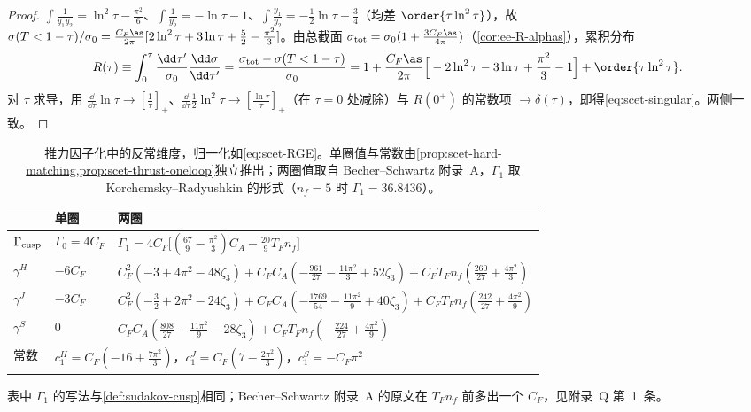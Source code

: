 \begin{proof}
$\int\frac{1}{y_1y_2}=\ln^2\tau-\frac{\pi^2}6$、$\int\frac1{y_2}=-\ln\tau-1$、$\int\frac{y_1}{y_2}=-\frac12\ln\tau-\frac34$（均差 $\order{\tau\ln^2\tau}$），故 $\sigma(T<1-\tau)/\sigma_0=\frac{C_F\as}{2\pi}[2\ln^2\tau+3\ln\tau+\frac52-\frac{\pi^2}{3}]$。由总截面 $\sigma_{\rm tot}=\sigma_0(1+\frac{3C_F\as}{4\pi})$（\cref{cor:ee-R-alphas}），累积分布
\[
R(\tau)\equiv\int_0^\tau\frac{\dd\tau'}{\sigma_0}\frac{\dd\sigma}{\dd\tau'}=\frac{\sigma_{\rm tot}-\sigma(T<1-\tau)}{\sigma_0}=1+\frac{C_F\as}{2\pi}\Big[-2\ln^2\tau-3\ln\tau+\frac{\pi^2}{3}-1\Big]+\order{\tau\ln^2\tau}.
\]
对 $\tau$ 求导，用 $\frac{\dd}{\dd\tau}\ln\tau\to[\frac1\tau]_+$、$\frac{\dd}{\dd\tau}\frac12\ln^2\tau\to[\frac{\ln\tau}\tau]_+$（在 $\tau=0$ 处减除）与 $R(0^+)$ 的常数项 $\to\delta(\tau)$，即得\cref{eq:scet-singular}。两侧一致。
\end{proof}

\begin{table}[htbp]
\centering\small
\renewcommand{\arraystretch}{1.3}
\begin{tabular}{@{}lll@{}}
\toprule
 & 单圈 & 两圈 \\
\midrule
$\Gamma_{\rm cusp}$ & $\Gamma_0=4C_F$ & $\Gamma_1=4C_F\big[(\frac{67}{9}-\frac{\pi^2}{3})C_A-\frac{20}{9}T_Fn_f\big]$ \\
$\gamma^H$ & $-6C_F$ & $C_F^2(-3+4\pi^2-48\zeta_3)+C_FC_A(-\frac{961}{27}-\frac{11\pi^2}{3}+52\zeta_3)+C_FT_Fn_f(\frac{260}{27}+\frac{4\pi^2}{3})$ \\
$\gamma^J$ & $-3C_F$ & $C_F^2(-\frac32+2\pi^2-24\zeta_3)+C_FC_A(-\frac{1769}{54}-\frac{11\pi^2}{9}+40\zeta_3)+C_FT_Fn_f(\frac{242}{27}+\frac{4\pi^2}{9})$ \\
$\gamma^S$ & $0$ & $C_FC_A(\frac{808}{27}-\frac{11\pi^2}{9}-28\zeta_3)+C_FT_Fn_f(-\frac{224}{27}+\frac{4\pi^2}{9})$ \\
常数 & \multicolumn{2}{l}{$c_1^H=C_F(-16+\frac{7\pi^2}{3})$，\quad $c_1^J=C_F(7-\frac{2\pi^2}{3})$，\quad $c_1^S=-C_F\pi^2$} \\
\bottomrule
\end{tabular}
\caption{推力因子化中的反常维度，归一化如\cref{eq:scet-RGE}。单圈值与常数由\cref{prop:scet-hard-matching,prop:scet-thrust-oneloop}独立推出；两圈值取自 Becher--Schwartz 附录~A\cite{BecherSchwartz2008}，$\Gamma_1$ 取 Korchemsky--Radyushkin 的形式\cite{KorchemskyRadyushkin1987,MochVermaserenVogt2004}（$n_f=5$ 时 $\Gamma_1=36.8436$）。}
\label{tab:scet-anomdim}
\end{table}
表中 $\Gamma_1$ 的写法与\cref{def:sudakov-cusp}相同；Becher--Schwartz 附录~A 的原文在 $T_Fn_f$ 前多出一个 $C_F$，见附录~Q 第~1~条。

